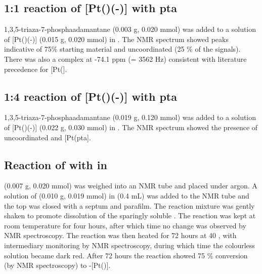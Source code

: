 \subsection*{1:1 reaction of \texorpdfstring{[Pt(\tButhixantphos)(-)]} P with pta}

1,3,5-triaza-7-phosphaadamantane (0.003 g, 0.020 mmol) was added to a solution of [Pt(\tButhixantphos)(-)] (0.015 g, 0.020 mmol) in .  The \phosphorus{} NMR spectrum showed peaks indicative of 75\% starting material and uncoordinated \tButhixantphos{} (25 \% of the \tButhixantphos{} signals).  There was also a complex at -74.1 ppm (\JPtP = 3562 Hz) consistent with literature precedence for [Pt(].\cite{Darensbourg1997}

\subsection*{1:4 reaction of \texorpdfstring{[Pt(\tButhixantphos)(-)]} P with pta}

1,3,5-triaza-7-phosphaadamantane (0.019 g, 0.120 mmol) was added to a solution of [Pt(\tButhixantphos)(-)] (0.022 g, 0.030 mmol) in .  The \phosphorus{} NMR spectrum showed the presence of uncoordinated \tButhixantphos{} and [Pt(pta].  


\subsection*{Reaction of \tButhixantphos{} with \ce{[Pt(C6H10)Cl2]} in }

\ce{[Pt(C6H10)Cl2]} (0.007 g, 0.020 mmol) was weighed into an NMR tube and placed under argon.  A solution of \tButhixantphos{} (0.010 g, 0.019 mmol) in  (0.4 mL) was added to the NMR tube and the top was closed with a septum and parafilm.  The reaction mixture was gently shaken to promote dissolution of the sparingly soluble \ce{[Pt(C6H10)Cl2]}.  The reaction was kept at room temperature for four hours, after which time no change was observed by NMR spectroscopy.  The reaction was then heated for 72 hours at 40 \degC, with intermediary monitoring by NMR spectroscopy, during which time the colourless solution became dark red.  After 72 hours the reaction showed 75 \% conversion (by \phosphorus{} NMR spectroscopy) to \trans-[Pt(\tBuxantphos)].

